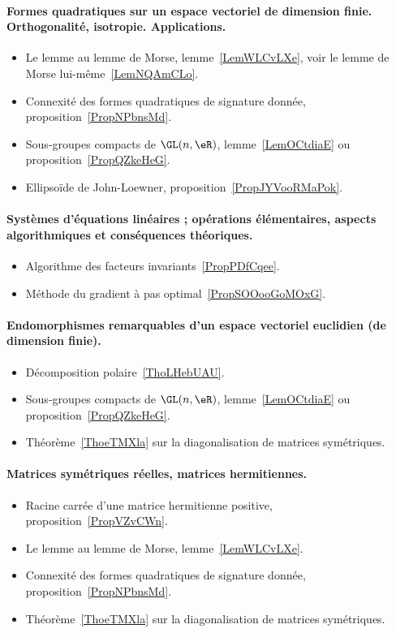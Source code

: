 \paragraph{Formes quadratiques sur un espace vectoriel de dimension finie. Orthogonalité, isotropie. Applications.}
\begin{itemize}
    \item Le lemme au lemme de Morse, lemme~\ref{LemWLCvLXe}, voir le lemme de Morse lui-même~\ref{LemNQAmCLo}.
    \item Connexité des formes quadratiques de signature donnée, proposition~\ref{PropNPbnsMd}.
    \item Sous-groupes compacts de \( \GL(n,\eR)\), lemme~\ref{LemOCtdiaE} ou proposition~\ref{PropQZkeHeG}.
    \item Ellipsoïde de John-Loewner, proposition~\ref{PropJYVooRMaPok}.
\end{itemize}
\paragraph{Systèmes d'équations linéaires ; opérations élémentaires, aspects algorithmiques et conséquences théoriques.}
\begin{itemize}
    \item Algorithme des facteurs invariants~\ref{PropPDfCqee}.
    \item Méthode du gradient à pas optimal~\ref{PropSOOooGoMOxG}.
\end{itemize}
\paragraph{Endomorphismes remarquables d’un espace vectoriel euclidien (de dimension finie).}
\begin{itemize}
    \item Décomposition polaire~\ref{ThoLHebUAU}.
    \item Sous-groupes compacts de \( \GL(n,\eR)\), lemme~\ref{LemOCtdiaE} ou proposition~\ref{PropQZkeHeG}.
    \item Théorème~\ref{ThoeTMXla} sur la diagonalisation de matrices symétriques.
\end{itemize}
\paragraph{Matrices symétriques réelles, matrices hermitiennes.}
\begin{itemize}
    \item Racine carrée d'une matrice hermitienne positive, proposition~\ref{PropVZvCWn}.
    \item Le lemme au lemme de Morse, lemme~\ref{LemWLCvLXe}.
    \item Connexité des formes quadratiques de signature donnée, proposition~\ref{PropNPbnsMd}.
    \item Théorème~\ref{ThoeTMXla} sur la diagonalisation de matrices symétriques.
\end{itemize}
